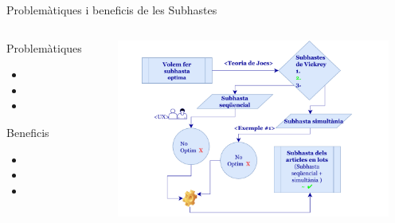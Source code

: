 \documentclass[twocolumn]{beamer}
\begin{document}
\begin{frame}{Problemàtiques i beneficis de les Subhastes}
\begin{columns}[t]
	\begin{column}{.3\textwidth}
		\begin{block}{Problemàtiques}
			\begin{itemize}
				\item
				\item
				\item
			\end{itemize}
		\end{block}
		
		\begin{block}{Beneficis}
			\begin{itemize}
				\item
				\item
				\item
			\end{itemize}
		\end{block}
	\end{column}
	\begin{column}{.7\textwidth}
		
		\includegraphics[width=9cm]{subs}	 
		
	\end{column}
\end{columns}
\end{frame}
\end{document}
